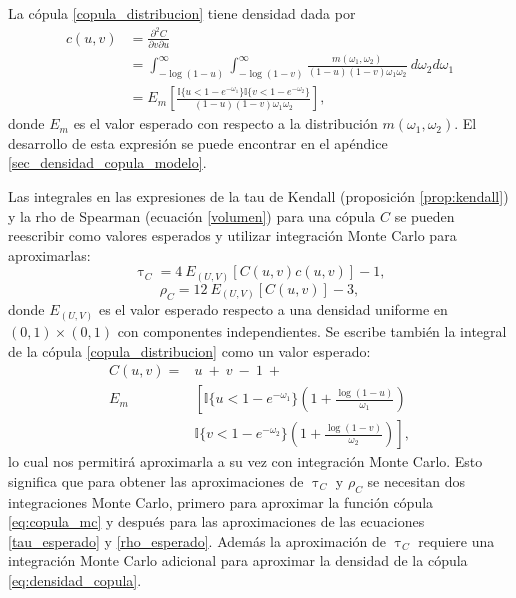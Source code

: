 \documentclass[11pt,a4paper]{article}
\begin{document}
La cópula \eqref{copula_distribucion} tiene densidad dada por
\begin{align}
c(u, v) &= \frac{\partial^2C}{\partial v \partial u}\nonumber\\
&= \int_{-\log (1-u)}^\infty \int_{-\log (1-v)}^\infty \frac{m(\omega_1, \omega_2)}{(1-u)(1-v)\omega_1\omega_2} \ d\omega_2 d\omega_1 \nonumber\\
&= E_{m} \left[\frac{\mathbb{I}\lbrace u < 1-e^{-\omega_1}\rbrace \mathbb{I}\lbrace v < 1-e^{-\omega_2} \rbrace}{(1-u)(1-v)\omega_1\omega_2}\right],
\label{eq:densidad_copula}
\end{align}
donde $E_m$ es el valor esperado con respecto a la distribución $m(\omega_1, \omega_2)$. El desarrollo de esta expresión se puede encontrar en el apéndice \ref{sec_densidad_copula_modelo}.

Las integrales en las expresiones de la tau de Kendall (proposición \ref{prop:kendall}) y la rho de Spearman (ecuación \eqref{volumen})  para una cópula $C$ se pueden reescribir como valores esperados y utilizar integración Monte Carlo para aproximarlas:
\begin{equation} \label{tau_esperado}
\uptau_{C} = 4 \ E_{(U, V)}\left[C(u, v) c(u, v)\right] -1,
\end{equation}
\begin{equation} \label{rho_esperado}
\rho_{C} = 12 \ E_{(U, V)}\left[C(u, v)\right] -3,
\end{equation}
donde $E_{(U, V)}$ es el valor esperado respecto a una densidad uniforme en \newline $(0, 1)\times (0, 1)$ con componentes independientes. Se escribe también la integral de la cópula \eqref{copula_distribucion} como un valor esperado:
\begin{align}
C(u, v) = &u \ + \ v \ - \ 1 \ +\nonumber\\
E_{m} & \left[\mathbb{I}\lbrace u < 1-e^{-\omega_1}\rbrace\left(1 + \frac{\log (1-u)}{\omega_1}\right) \right.\nonumber\\
& \left. \mathbb{I}\lbrace v < 1-e^{-\omega_2}\rbrace\left(1 + \frac{\log (1-v)}{\omega_2}\right)\right], \label{eq:copula_mc}
\end{align}
lo cual nos permitirá aproximarla a su vez con integración Monte Carlo. Esto significa que para obtener las aproximaciones de $\uptau_C$ y $\rho_C$ se necesitan dos integraciones Monte Carlo, primero para aproximar la función cópula \eqref{eq:copula_mc} y después para las aproximaciones de las ecuaciones \eqref{tau_esperado} y \eqref{rho_esperado}. Además la aproximación de $\uptau_C$ requiere una integración Monte Carlo adicional para aproximar la densidad de la cópula \eqref{eq:densidad_copula}.
\end{document}
